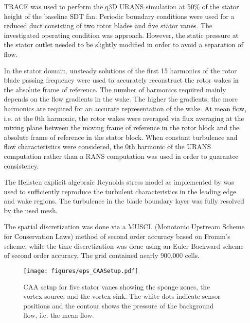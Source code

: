 TRACE was used to perform the q3D URANS simulation at 50\% of the stator height of the baseline SDT fan. Periodic boundary conditions were used for a reduced duct consisting of two rotor blades and five stator vanes.  The investigated operating condition was approach.  However, the static pressure at the stator outlet needed to be slightly modified in order to avoid a separation of flow.  %

In the stator domain, unsteady solutions of the first 15 harmonics of the rotor blade passing frequency were used to accurately reconstruct the rotor wakes in the absolute frame of reference.  The number of harmonics required mainly depends on the flow gradients in the wake.  The higher the gradients, the more harmonics are required for an accurate representation of the wake.  At mean flow, i.e. at the 0th harmonic, the rotor wakes were averaged via flux averaging at the mixing plane between the moving frame of reference in the rotor block and the absolute frame of reference in the stator block.  When constant turbulence and flow characteristics were considered, the 0th harmonic of the URANS computation rather than a RANS computation was used in order to guarantee consistency.

The Hellsten explicit algebraic Reynolds stress model as implemented by \citet{franke_turbulence_2010} was used to sufficiently reproduce the turbulent characteristics in the leading edge and wake regions. The turbulence in the blade boundary layer was fully resolved by the used mesh.

The spatial discretization was done via a MUSCL (Monotonic Upstream Scheme for Conservation Laws) method of second order accuracy based on Fromm's scheme, while the time discretization was done using an Euler Backward scheme of second order accuracy.  The grid contained nearly 900,000 cells. %


	

\begin{figure}
\centering
\texttt{[image: figures/eps\_CAASetup.pdf]}
\caption{CAA setup for five stator vanes showing the sponge zones, the vortex source, and the vortex sink.  The white dots indicate sensor positions and the contour shows the pressure of the background flow, i.e. the mean flow. \label{fig:CAA_Setup} }
\end{figure}

